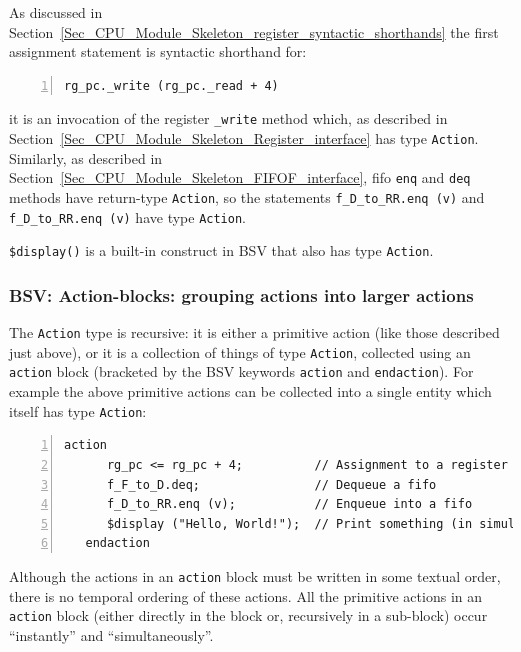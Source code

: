 As discussed in
Section~\ref{Sec_CPU_Module_Skeleton_register_syntactic_shorthands}
the first assignment statement is syntactic shorthand for:

\begin{Verbatim}[frame=single, numbers=left]
   rg_pc._write (rg_pc._read + 4)
\end{Verbatim}

{\ie} it is an invocation of the register \verb|_write| method which,
as described in
Section~\ref{Sec_CPU_Module_Skeleton_Register_interface} has type
\verb|Action|.  Similarly, as described in
Section~\ref{Sec_CPU_Module_Skeleton_FIFOF_interface}, fifo \verb|enq|
and \verb|deq| methods have return-type \verb|Action|, so the
statements \verb|f_D_to_RR.enq (v)| and \verb|f_D_to_RR.enq (v)| have
type \verb|Action|.


\verb|$display()| is a built-in construct in BSV that also has type
\verb|Action|.


\subsubsection{BSV: Action-blocks: grouping actions into larger actions}

The \verb|Action| type is recursive: it is either a primitive action
(like those described just above), or it is a collection of things of
type \verb|Action|, collected using an \verb|action| block (bracketed
by the BSV keywords \verb|action| and \verb|endaction|).  For example
the above primitive actions can be collected into a single entity
which itself has type \verb|Action|:

\begin{Verbatim}[frame=single, numbers=left]
   action
      rg_pc <= rg_pc + 4;          // Assignment to a register
      f_F_to_D.deq;                // Dequeue a fifo
      f_D_to_RR.enq (v);           // Enqueue into a fifo
      $display ("Hello, World!");  // Print something (in simulation only)
   endaction
\end{Verbatim}

Although the actions in an \verb|action| block must be written in some
textual order, there is no temporal ordering of these actions.  All
the primitive actions in an \verb|action| block (either directly in
the block or, recursively in a sub-block) occur ``instantly'' and
``simultaneously''.

